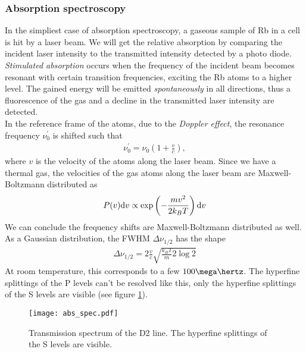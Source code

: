 \subsubsection{Absorption spectroscopy}
In the simpliest case of absorption spectroscopy, a gaseous sample of Rb in a cell is hit by a laser beam. We will get the relative absorption by comparing the incident laser intensity to the transmitted intensity detected by a photo diode. \emph{Stimulated absorption} occurs when the frequency of the incident beam becomes resonant with certain transition frequencies, exciting the Rb atoms to a higher level. The gained energy will be emitted \emph{spontaneously} in all directions, thus a fluorescence of the gas and a decline in the transmitted laser intensity are detected.\\
In the reference frame of the atoms, due to the \emph{Doppler effect}, the resonance frequency $\nu_0^\prime$ is shifted such that
\begin{align}
\nu_0^\prime=\nu_0\left(1+\frac{v}{c}\right),
\end{align}
where $v$ is the velocity of the atoms along the laser beam.
Since we have a thermal gas, the velocities of the gas atoms along the laser beam are Maxwell-Boltzmann distributed as
\begin{align}
P(v)\mathrm{d} v\propto \exp\left(-\frac{mv^2}{2k_B T}\right)\mathrm{d} v
\end{align}
We can conclude the frequency shifts are Maxwell-Boltzmann distributed as well. As a Gaussian distribution, the FWHM $\Delta\nu_{1/2}$ has the shape
\begin{align}
\Delta\nu_{1/2}=2\frac{v}{c}\sqrt{\frac{k_B T}{m}2\log 2}
\end{align}
At room temperature, this corresponds to a few $100\mega\hertz$. The hyperfine splittings of the P levels can't be resolved like this, only the hyperfine splittings of the S levels are visible (see figure \ref{fig:abs_spec}).
\begin{figure}[h]
	\centering
	\texttt{[image: abs\_spec.pdf]}
	\caption[Transmission spectrum of the D2 line]{Transmission spectrum of the D2 line. The hyperfine splittings of the S levels are visible. \cite{lit:AK_manual2012}}
	\label{fig:abs_spec}
\end{figure}
